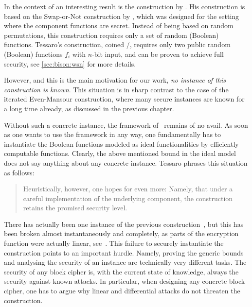 In the context of  an interesting result is the construction by \textcite{AC:Tessaro15}.
His construction is based on the Swap-or-Not construction by \textcite{C:HoaMorRog12}, which was designed for the setting where the component functions are secret.
Instead of being based on random permutations, this construction requires only a set of random (Boolean) functions.
Tessaro's construction, coined \WSNf/, requires only two public random (Boolean) functions $f_i$ with $n$-bit input, and can be proven to achieve full security, see \cref{sec:bison:wsn} for more details.

However, and this is the main motivation for our work, \emph{no instance of this construction is known}.
This situation is in sharp contrast to the case of the iterated Even-Mansour construction, where many secure instances are known for a long time already, as discussed in the previous chapter.

Without such a concrete instance, the framework of~\cite{AC:Tessaro15} remains of no avail.
As soon as one wants to use the framework in any way, one fundamentally has to instantiate the Boolean functions modeled as ideal functionalities by efficiently computable functions.
Clearly, the above mentioned bound in the ideal model does not say anything about any concrete instance.
Tessaro phrases this situation as follows:
\begin{quote}
    Heuristically, however, one hopes for even more: Namely, that under a careful implementation of the underlying component, the construction retains the promised security level.
    \hfill{}\cite{AC:Tessaro15}
\end{quote}

There has actually been one instance of the previous construction~\cite{C:HoaMorRog12}, but this has been broken almost instantaneously and completely, as parts of the encryption function were actually linear, see~\cite{C:Vaudenay12rump}.
This failure to securely instantiate the construction points to an important hurdle.
Namely, proving the generic bounds and analysing the security of an instance are technically very different tasks.
The security of any block cipher is, with the current state of knowledge, always the security against known attacks.
In particular, when designing any concrete block cipher, one has to argue why linear and differential attacks do not threaten the construction.

